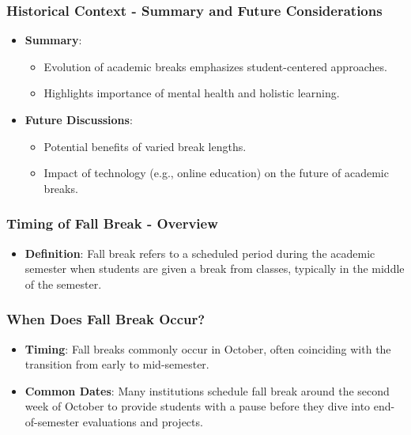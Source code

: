 \documentclass[aspectratio=169]{beamer}
\begin{document}
\begin{frame}[fragile]
    \frametitle{Historical Context - Summary and Future Considerations}
    \begin{itemize}
        \item \textbf{Summary}:
        \begin{itemize}
            \item Evolution of academic breaks emphasizes student-centered approaches.
            \item Highlights importance of mental health and holistic learning.
        \end{itemize}
        \item \textbf{Future Discussions}:
        \begin{itemize}
            \item Potential benefits of varied break lengths.
            \item Impact of technology (e.g., online education) on the future of academic breaks.
        \end{itemize}
    \end{itemize}
\end{frame}

\begin{frame}[fragile]
    \frametitle{Timing of Fall Break - Overview}
    \begin{itemize}
        \item \textbf{Definition}: Fall break refers to a scheduled period during the academic semester when students are given a break from classes, typically in the middle of the semester.
    \end{itemize}
\end{frame}

\begin{frame}[fragile]
    \frametitle{When Does Fall Break Occur?}
    \begin{itemize}
        \item \textbf{Timing}: Fall breaks commonly occur in October, often coinciding with the transition from early to mid-semester.
        \item \textbf{Common Dates}: Many institutions schedule fall break around the second week of October to provide students with a pause before they dive into end-of-semester evaluations and projects.
    \end{itemize}
\end{frame}
\end{document}
